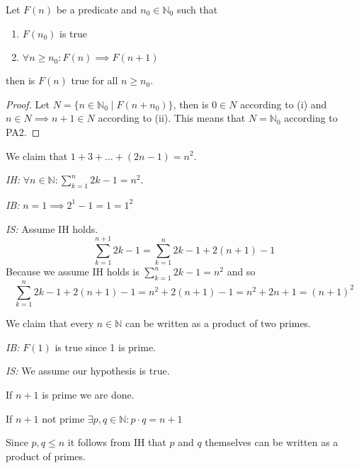\begin{proposition}
   Let \(F(n)\) be a predicate and \(n_0 \in \mathbb{N}_0\) such that
   \begin{enumerate}[label=\roman*, align=Center]
      \item \(F(n_0)\) is true
      \item \(\forall n \geq n_0: F(n) \implies F(n + 1)\)
   \end{enumerate}
   then is \(F(n)\) true for all \(n \geq n_0\).
\end{proposition}
\begin{proof}
   Let \(N = \{n \in \mathbb{N}_0 \mid F(n + n_0)\}\), then is \(0 \in N\) according to (i) and \(n \in N \implies n + 1 \in N\) according to (ii).
   This means that \(N = \mathbb{N}_0\) according to PA2.
\end{proof}
\begin{example}
   We claim that \(1 + 3 + \ldots + (2n - 1) = n^2\).

   \textit{IH:} \(\forall n \in \mathbb{N}: \sum_{k = 1}^{n} 2k - 1 = n^2\).

   \textit{IB:} \(n = 1 \implies 2^1 - 1 = 1 = 1^2\)

   \textit{IS:} Assume IH holds.
   \[\sum_{k = 1}^{n+1} 2k - 1 = \sum_{k = 1}^{n} 2k - 1 + 2(n + 1) - 1\]
   Because we assume IH holds is \(\sum_{k = 1}^{n} 2k - 1 = n^2\) and so
   \[\sum_{k = 1}^{n} 2k - 1 + 2(n + 1) - 1 = n^2 + 2(n + 1) -1 = n^2 + 2n + 1 = (n + 1)^2\]
\end{example}
\begin{example}
   We claim that every \(n \in \mathbb{N}\) can be written as a product of two primes.

   \textit{IB:} \(F(1)\) is true since 1 is prime.

   \textit{IS:} We assume our hypothesis is true.

   If \(n+1\) is prime we are done.

   If \(n+1\) not prime \(\exists p, q \in \mathbb{N}: p \cdot q = n + 1\)

   Since \(p, q \leq n\) it follows from IH that \(p\) and \(q\) themselves can be written as a product of primes.
\end{example}


